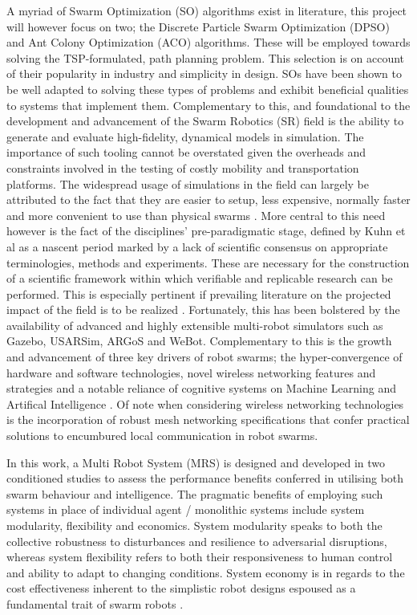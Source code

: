 \documentclass{report}
\begin{document}
A myriad of Swarm Optimization (SO) algorithms exist in literature, this project will however focus on two; the Discrete Particle Swarm Optimization (DPSO) and Ant Colony Optimization (ACO) algorithms. These will be employed towards solving the TSP-formulated, path planning problem. This selection is on account of their popularity in industry and simplicity in design. SOs have been shown to be well adapted to solving these types of problems and exhibit beneficial qualities to systems that implement them. Complementary to this, and foundational to the development and advancement of the Swarm Robotics (SR) field is the ability to generate and evaluate high-fidelity, dynamical models in simulation. The importance of such tooling cannot be overstated given the overheads and constraints involved in the testing of costly mobility and transportation platforms. The widespread usage of simulations in the field can largely be attributed to the fact that they are easier to setup, less expensive, normally faster and more convenient to use than physical swarms \cite{WeBot2004}. More central to this need however is the fact of the disciplines' pre-paradigmatic stage, defined by Kuhn et al \cite{Kuhn2015} as a nascent period marked by a lack of scientific consensus on appropriate terminologies, methods and experiments. These are necessary for the construction of a scientific framework within which verifiable and replicable research can be performed. This is especially pertinent if prevailing literature on the projected impact of the field is to be realized \cite{Yang2018}. Fortunately, this has been bolstered by the availability of advanced and highly extensible multi-robot simulators such as Gazebo, USARSim, ARGoS \cite{Pinciroli2014} and WeBot. Complementary to this is the growth and advancement of three key drivers of robot swarms; the hyper-convergence of hardware and software technologies, novel wireless networking features and strategies and a notable reliance of cognitive systems on Machine Learning and Artifical Intelligence \cite{Yang2018}. Of note when considering wireless networking technologies is the incorporation of robust mesh networking specifications \cite{Blue2018} that confer practical solutions to encumbured local communication in robot swarms.

In this work, a Multi Robot System (MRS) is designed and developed in two conditioned studies to assess the performance benefits conferred in utilising both swarm behaviour and intelligence. The pragmatic benefits of employing such systems in place of individual agent / monolithic systems include system modularity, flexibility and economics. System modularity speaks to both the collective robustness to disturbances and resilience to adversarial disruptions, whereas system flexibility refers to both their responsiveness to human control and ability to adapt to changing conditions. System economy is in regards to the cost effectiveness inherent to the simplistic robot designs espoused as a fundamental trait of swarm robots \cite{Yang2018}.
\end{document}
